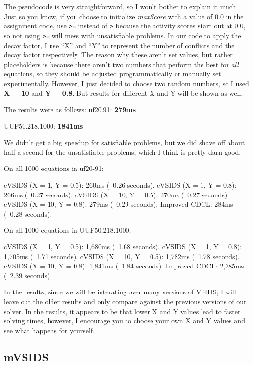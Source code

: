 \documentclass[../main.tex]{subfiles}
\begin{document}
The pseudocode is very straightforward, so I won't bother to explain it much. Just 
so you know, if you choose to initialize \textit{maxScore} with a value of 0.0 in the 
assignment code, use \verb|>=| instead of \verb|>| because the activity scores start 
out at 0.0, so not using \verb|>=| will mess with unsatisfiable problems. In our 
code to apply the decay factor, I use ``X'' and ``Y'' to represent the number of 
conflicts and the decay factor respectively. The reason why these aren't set values,
but rather placeholders is because there aren't two numbers that perform the best for
\textit{all} equations, so they should be adjusted programmatically or manually set 
experimentally. However, I just decided to choose two random numbers, so I used 
\textbf{X = 10} and \textbf{Y = 0.8}. But results for different X and Y will be 
shown as well.

The results were as follows:
\noindent
uf20.91: \textbf{279ms}

\noindent
UUF50.218.1000: \textbf{1841ms}

We didn't get a big speedup for satisfiable problems, but we 
did shave off about half a second for the unsatisfiable problems, 
which I think is pretty darn good.

\begin{FVerbatim}
On all 1000 equations in uf20-91:

cVSIDS (X = 1, Y = 0.5):    260ms (~0.26 seconds).
cVSIDS (X = 1, Y = 0.8):    266ms (~0.27 seconds).
cVSIDS (X = 10, Y = 0.5):   270ms (~0.27 seconds).
cVSIDS (X = 10, Y = 0.8):   279ms (~0.29 seconds).
Improved CDCL:              284ms (~0.28 seconds).

On all 1000 equations in UUF50.218.1000:

cVSIDS (X = 1, Y = 0.5):    1,680ms (~1.68 seconds).
cVSIDS (X = 1, Y = 0.8):    1,705ms (~1.71 seconds).
cVSIDS (X = 10, Y = 0.5):   1,782ms (~1.78 seconds).
cVSIDS (X = 10, Y = 0.8):   1,841ms (~1.84 seconds).
Improved CDCL:              2,385ms (~2.39 seconds).
\end{FVerbatim}
\noindent
In the results, since we will be interating over many versions of VSIDS, 
I will leave out the older results and only compare against the previous 
versions of our solver. In the results, it appears to be that lower 
X and Y values lead to faster solving times, however, I encourage you to 
choose your own X and Y values and see what happens for yourself.

\subsection{mVSIDS}
\end{document}
